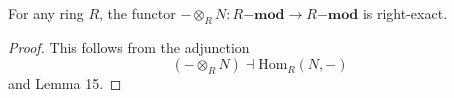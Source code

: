  \begin{lemma}
    For any ring $ R $, the functor $ - \otimes_R N: R\mathbf{-mod} \to R\mathbf{-mod} $ is right-exact.
 \end{lemma}
 \begin{proof}
    This follows from the adjunction
    \begin{equation*}
       (- \otimes_R N) \dashv \text{Hom}_R(N,-)
    \end{equation*}
    and Lemma 15.
 \end{proof}

